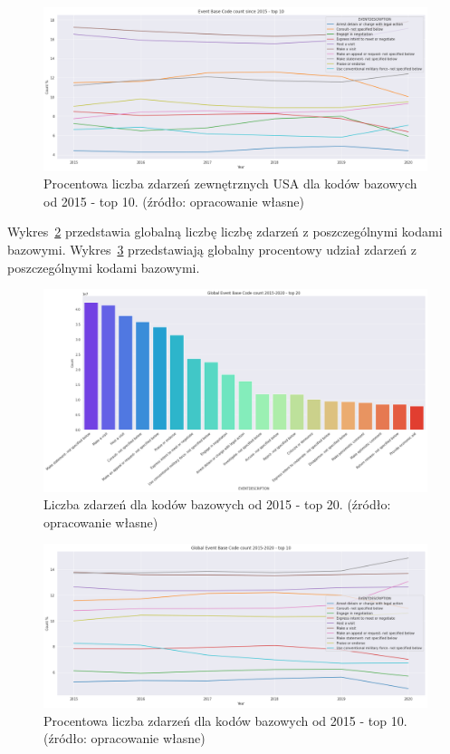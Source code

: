 \documentclass[11pt]{report}
\begin{document}
    \begin{figure}[!htp]
        \centering
        \includegraphics[width=\linewidth]{fig/USA not inner/EBCperc.png}
        \caption{Procentowa liczba zdarzeń zewnętrznych USA dla kodów bazowych od 2015 - top 10. (źródło: opracowanie własne)}
        \label{fig:USA_not_inner_EBCperc}
    \end{figure}

    Wykres~\ref{fig:GLOBAL_EBC} przedstawia globalną liczbę liczbę zdarzeń z poszczególnymi kodami bazowymi.
    Wykres~\ref{fig:GLOBAL_EBCperc} przedstawiają globalny procentowy udział zdarzeń z poszczególnymi kodami bazowymi.

    \begin{figure}[!htp]
        \centering
        \includegraphics[width=\linewidth]{fig/GLOBAL//EBC.png}
        \caption{Liczba zdarzeń dla kodów bazowych od 2015 - top 20. (źródło: opracowanie własne)}
        \label{fig:GLOBAL_EBC}
    \end{figure}

    \begin{figure}[!htp]
        \centering
        \includegraphics[width=\linewidth]{fig/GLOBAL//EBCperc.png}
        \caption{Procentowa liczba zdarzeń dla kodów bazowych od 2015 - top 10. (źródło: opracowanie własne)}
        \label{fig:GLOBAL_EBCperc}
    \end{figure}
\end{document}
